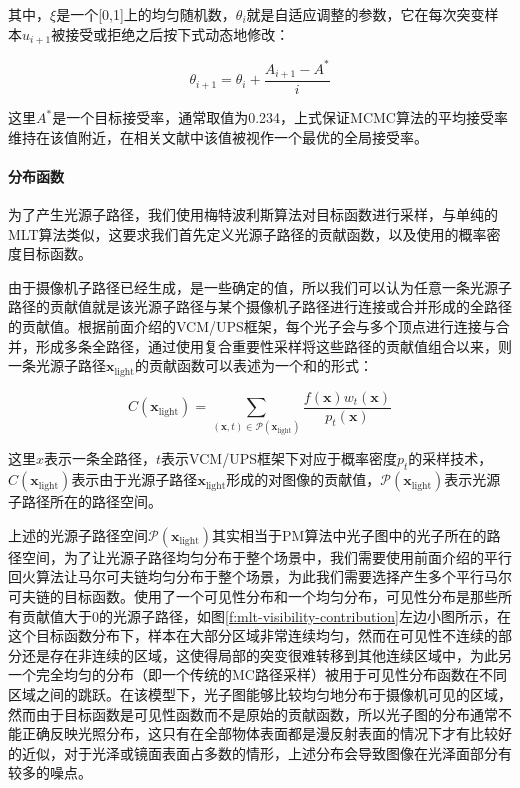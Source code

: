 \noindent 其中，$\xi$是一个[0,1]上的均匀随机数，$\theta_i$就是自适应调整的参数，它在每次突变样本$u_{i+1}$被接受或拒绝之后按下式动态地修改：

\begin{equation}
	\theta_{i+1}=\theta_i+\frac{A_{i+1}-A^{*}}{i}
\end{equation}

\noindent 这里$A^{*}$是一个目标接受率，通常取值为0.234，上式保证MCMC算法的平均接受率维持在该值附近，在相关文献中\cite{a:Weakconvergenceandoptimalscalingofrandomwalkmetropolisalgorithms}该值被视作一个最优的全局接受率。




\paragraph{分布函数}
为了产生光源子路径，我们使用梅特波利斯算法对目标函数进行采样，与单纯的MLT算法类似，这要求我们首先定义光源子路径的贡献函数，以及使用的概率密度目标函数。

由于摄像机子路径已经生成，是一些确定的值，所以我们可以认为任意一条光源子路径的贡献值就是该光源子路径与某个摄像机子路径进行连接或合并形成的全路径的贡献值。根据前面介绍的VCM/UPS框架，每个光子会与多个顶点进行连接与合并，形成多条全路径，通过使用复合重要性采样将这些路径的贡献值组合以来，则一条光源子路径${\mathbf{x}}_{\text{light}}$的贡献函数可以表述为一个和的形式：

\begin{equation}
	C({\mathbf{x}}_{\text{light}})=\sum_{({\mathbf{x}},t)\in\mathcal{P}({\mathbf{x}}_{\text{light}})}\frac{f({\mathbf{x}})w_t({\mathbf{x}})}{p_t({\mathbf{x}})}
\end{equation}

\noindent 这里${x}$表示一条全路径，$t$表示VCM/UPS框架下对应于概率密度$p_t$的采样技术，$C({\mathbf{x}}_{\text{light}})$表示由于光源子路径${\mathbf{x}}_{\text{light}}$形成的对图像的贡献值，$\mathcal{P}({\mathbf{x}}_{\text{light}})$表示光源子路径所在的路径空间。

上述的光源子路径空间$\mathcal{P}({\mathbf{x}}_{\text{light}})$其实相当于PM算法中光子图中的光子所在的路径空间，为了让光源子路径均匀分布于整个场景中，我们需要使用前面介绍的平行回火算法让马尔可夫链均匀分布于整个场景，为此我们需要选择产生多个平行马尔可夫链的目标函数。\cite{a:RobustAdaptivePhotonTracingusingPhotonPathVisibility}使用了一个可见性分布和一个均匀分布，可见性分布是那些所有贡献值大于0的光源子路径，如图\ref{f:mlt-visibility-contribution}左边小图所示，在这个目标函数分布下，样本在大部分区域非常连续均匀，然而在可见性不连续的部分还是存在非连续的区域，这使得局部的突变很难转移到其他连续区域中，为此另一个完全均匀的分布（即一个传统的MC路径采样）被用于可见性分布函数在不同区域之间的跳跃。在该模型下，光子图能够比较均匀地分布于摄像机可见的区域，然而由于目标函数是可见性函数而不是原始的贡献函数，所以光子图的分布通常不能正确反映光照分布，这只有在全部物体表面都是漫反射表面的情况下才有比较好的近似，对于光泽或镜面表面占多数的情形，上述分布会导致图像在光泽面部分有较多的噪点。

